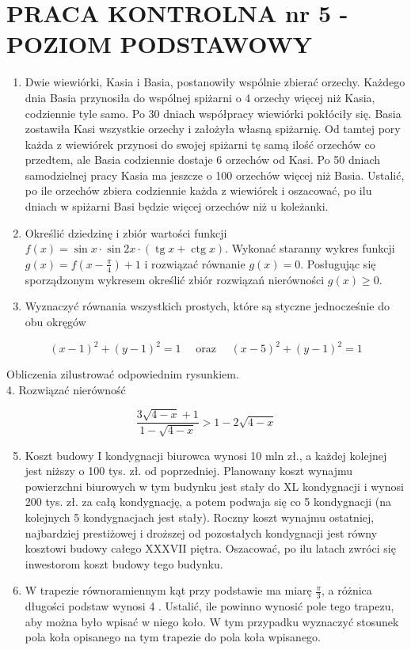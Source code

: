 \documentclass[10pt]{article}
\begin{document}
\section*{PRACA KONTROLNA nr 5 - POZIOM PODSTAWOWY}
\begin{enumerate}
  \item Dwie wiewiórki, Kasia i Basia, postanowiły wspólnie zbierać orzechy. Każdego dnia Basia przynosiła do wspólnej spiżarni o 4 orzechy więcej niż Kasia, codziennie tyle samo. Po 30 dniach współpracy wiewiórki pokłóciły się. Basia zostawiła Kasi wszystkie orzechy i założyła własną spiżarnię. Od tamtej pory każda z wiewiórek przynosi do swojej spiżarni tę samą ilość orzechów co przedtem, ale Basia codziennie dostaje 6 orzechów od Kasi. Po 50 dniach samodzielnej pracy Kasia ma jeszcze o 100 orzechów więcej niż Basia. Ustalić, po ile orzechów zbiera codziennie każda z wiewiórek i oszacować, po ilu dniach w spiżarni Basi będzie więcej orzechów niż u koleżanki.
  \item Określić dziedzinę i zbiór wartości funkcji $f(x)=\sin x \cdot \sin 2 x \cdot(\operatorname{tg} x+\operatorname{ctg} x)$. Wykonać staranny wykres funkcji $g(x)=f\left(x-\frac{\pi}{4}\right)+1$ i rozwiązać równanie $g(x)=0$. Posługując się sporządzonym wykresem określić zbiór rozwiązań nierówności $g(x) \geqslant 0$.
  \item Wyznaczyć równania wszystkich prostych, które są styczne jednocześnie do obu okręgów
\end{enumerate}

$$
(x-1)^{2}+(y-1)^{2}=1 \quad \text { oraz } \quad(x-5)^{2}+(y-1)^{2}=1
$$

Obliczenia zilustrować odpowiednim rysunkiem.\\
4. Rozwiązać nierówność

$$
\frac{3 \sqrt{4-x}+1}{1-\sqrt{4-x}}>1-2 \sqrt{4-x}
$$

\begin{enumerate}
  \setcounter{enumi}{4}
  \item Koszt budowy I kondygnacji biurowca wynosi 10 mln zł., a każdej kolejnej jest niższy o 100 tys. zł. od poprzedniej. Planowany koszt wynajmu powierzchni biurowych w tym budynku jest stały do XL kondygnacji i wynosi 200 tys. zł. za całą kondygnację, a potem podwaja się co 5 kondygnacji (na kolejnych 5 kondygnacjach jest stały). Roczny koszt wynajmu ostatniej, najbardziej prestiżowej i droższej od pozostałych kondygnacji jest równy kosztowi budowy całego XXXVII piętra. Oszacować, po ilu latach zwróci się inwestorom koszt budowy tego budynku.
  \item W trapezie równoramiennym kąt przy podstawie ma miarę $\frac{\pi}{3}$, a różnica długości podstaw wynosi 4 . Ustalić, ile powinno wynosić pole tego trapezu, aby można było wpisać w niego koło. W tym przypadku wyznaczyć stosunek pola koła opisanego na tym trapezie do pola koła wpisanego.
\end{enumerate}
\end{document}
